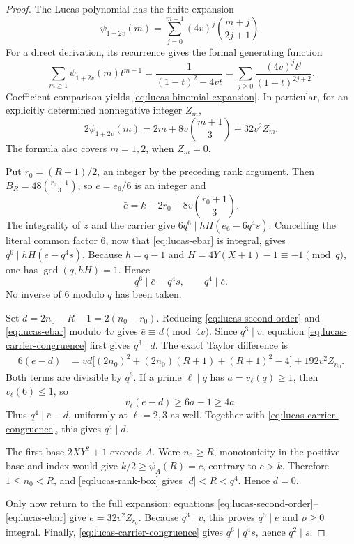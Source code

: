\documentclass[11pt,letterpaper]{article}
\theoremstyle{definition}
\theoremstyle{remark}
\begin{document}
\begin{proof}
The Lucas polynomial has the finite expansion
\begin{equation}
 \psi_{1+2v}(m)=\sum_{j=0}^{m-1}(4v)^j
                    \binom{m+j}{2j+1}.
 \label{eq:lucas-binomial-expansion}
\end{equation}
For a direct derivation, its recurrence gives the formal generating function
\[
 \sum_{m\ge1}\psi_{1+2v}(m)t^{m-1}
 =\frac1{(1-t)^2-4vt}
 =\sum_{j\ge0}\frac{(4v)^jt^j}{(1-t)^{2j+2}}.
\]
Coefficient comparison yields \eqref{eq:lucas-binomial-expansion}.  In
particular, for an explicitly determined nonnegative integer $Z_m$,
\begin{equation}
 2\psi_{1+2v}(m)
 =2m+8v\binom{m+1}{3}+32v^2Z_m.
 \label{eq:lucas-second-order}
\end{equation}
The formula also covers $m=1,2$, when $Z_m=0$.

Put $r_0=(R+1)/2$, an integer by the preceding rank argument.  Then
$B_R=48\binom{r_0+1}{3}$, so $\bar e=e_6/6$ is an integer and
\begin{equation}
 \bar e=k-2r_0-8v\binom{r_0+1}{3}.
 \label{eq:lucas-ebar}
\end{equation}
The integrality of $z$ and the carrier give
$6q^6\mid hH(e_6-6q^4s)$.  Cancelling the literal common factor $6$,
now that \eqref{eq:lucas-ebar} is integral, gives
$q^6\mid hH(\bar e-q^4s)$.  Because $h=q-1$ and
$H=4Y(X+1)-1\equiv-1\pmod q$, one has $\gcd(q,hH)=1$.  Hence
\begin{equation}
 q^6\mid\bar e-q^4s,\qquad q^4\mid\bar e.
 \label{eq:lucas-carrier-congruence}
\end{equation}
No inverse of $6$ modulo $q$ has been taken.

Set $d=2n_0-R-1=2(n_0-r_0)$.  Reducing
\eqref{eq:lucas-second-order} and \eqref{eq:lucas-ebar} modulo $4v$
gives $\bar e\equiv d\pmod{4v}$.  Since $q^3\mid v$, equation
\eqref{eq:lucas-carrier-congruence} first gives $q^3\mid d$.
The exact Taylor difference is
\begin{align}
 6(\bar e-d)
 &=vd\bigl[(2n_0)^2+(2n_0)(R+1)+(R+1)^2-4\bigr]
       +192v^2Z_{n_0}.
 \label{eq:lucas-taylor-upgrade}
\end{align}
Both terms are divisible by $q^6$.  If a prime $\ell\mid q$ has
$a=v_\ell(q)\ge1$, then $v_\ell(6)\le1$, so
\[
 v_\ell(\bar e-d)\ge6a-1\ge4a.
\]
Thus $q^4\mid\bar e-d$, uniformly at $\ell=2,3$ as well.  Together
with \eqref{eq:lucas-carrier-congruence}, this gives $q^4\mid d$.

The first base $2XY^2+1$ exceeds $A$.  Were $n_0\ge R$, monotonicity
in the positive base and index would give $k/2\ge\psi_A(R)=c$,
contrary to $c>k$.  Therefore $1\le n_0<R$, and
\eqref{eq:lucas-rank-box} gives $|d|<R<q^4$.  Hence $d=0$.

Only now return to the full expansion: equations
\eqref{eq:lucas-second-order}--\eqref{eq:lucas-ebar} give
$\bar e=32v^2Z_{r_0}$.  Because $q^3\mid v$, this proves
$q^6\mid\bar e$ and $\rho\ge0$ integral.  Finally,
\eqref{eq:lucas-carrier-congruence} gives $q^6\mid q^4s$, hence
$q^2\mid s$.
\end{proof}
\end{document}
